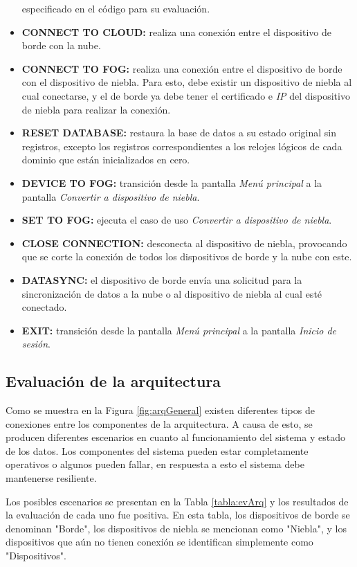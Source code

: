 \begin{itemize}
 especificado en el código para su evaluación.
    \item \textbf{CONNECT TO CLOUD: }realiza una conexión entre el dispositivo de borde con la nube.
    \item \textbf{CONNECT TO FOG: }realiza una conexión entre el dispositivo de borde con el dispositivo de niebla. Para esto, debe existir un dispositivo de niebla al cual conectarse, y el de borde ya debe tener el certificado e \textit{IP} del dispositivo de niebla para realizar la conexión.
    \item \textbf{RESET DATABASE: }restaura la base de datos a su estado original sin registros, excepto los registros correspondientes a los relojes lógicos de cada dominio que están inicializados en cero.
    \item \textbf{DEVICE TO FOG:} transición desde la pantalla \textit{Menú principal} a la pantalla  \textit{Convertir a dispositivo de niebla}.
    \item \textbf{SET TO FOG: }ejecuta el caso de uso \textit{Convertir a dispositivo de niebla}.
    \item \textbf{CLOSE CONNECTION: }desconecta al dispositivo de niebla, provocando que se corte la conexión de todos los dispositivos de borde y la nube con este.
    \item \textbf{DATASYNC: }el dispositivo de borde envía una solicitud para la sincronización de datos a la nube o al dispositivo de niebla al cual esté conectado.
    \item \textbf{EXIT: }transición desde la pantalla \textit{Menú principal} a la pantalla  \textit{Inicio de sesión}.
\end{itemize}


\subsection{Evaluación de la arquitectura}
Como se muestra en la Figura \ref{fig:arqGeneral} existen diferentes tipos de conexiones entre los componentes de la arquitectura. A causa de esto, se producen diferentes escenarios en cuanto al funcionamiento del sistema y estado de los datos. Los componentes del sistema pueden estar completamente operativos o algunos pueden fallar, en respuesta a esto el sistema debe mantenerse resiliente.

Los posibles escenarios se presentan en la Tabla \ref{tabla:evArq} y los resultados de la evaluación de cada uno fue positiva. En esta tabla, los dispositivos de borde se denominan "Borde", los dispositivos de niebla se mencionan como "Niebla", y los dispositivos que aún no tienen conexión se identifican simplemente como "Dispositivos".

